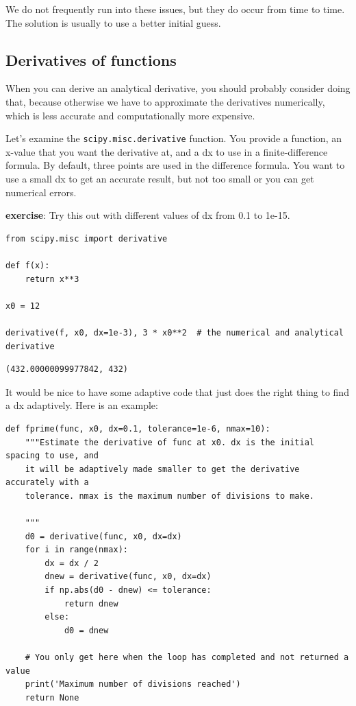 \documentclass[11pt]{article}
\begin{document}
We do not frequently run into these issues, but they do occur from time to time. The solution is usually to use a better initial guess.

\subsection{Derivatives of functions}
\label{sec:org373cedf}

When you can derive an analytical derivative, you should probably consider doing that, because otherwise we have to approximate the derivatives numerically, which is less accurate and computationally more expensive.

Let's examine the \texttt{scipy.misc.derivative} function. You provide a function, an x-value that you want the derivative at, and a dx to use in a finite-difference formula. By default, three points are used in the difference formula. You want to use a small dx to get an accurate result, but not too small or you can get numerical errors.

\textbf{exercise}: Try this out with different values of dx from 0.1 to 1e-15.

\begin{verbatim}
from scipy.misc import derivative

def f(x):
    return x**3

x0 = 12

derivative(f, x0, dx=1e-3), 3 * x0**2  # the numerical and analytical derivative
\end{verbatim}

\begin{verbatim}
(432.00000099977842, 432)
\end{verbatim}

It would be nice to have some adaptive code that just does the right thing to find a dx adaptively. Here is an example:

\begin{verbatim}
def fprime(func, x0, dx=0.1, tolerance=1e-6, nmax=10):
    """Estimate the derivative of func at x0. dx is the initial spacing to use, and
    it will be adaptively made smaller to get the derivative accurately with a
    tolerance. nmax is the maximum number of divisions to make.

    """
    d0 = derivative(func, x0, dx=dx)
    for i in range(nmax):
        dx = dx / 2
        dnew = derivative(func, x0, dx=dx)
        if np.abs(d0 - dnew) <= tolerance:
            return dnew
        else:
            d0 = dnew

    # You only get here when the loop has completed and not returned a value
    print('Maximum number of divisions reached')
    return None
\end{verbatim}
\end{document}
